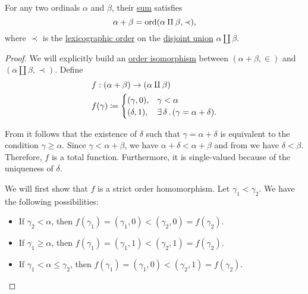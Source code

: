 \begin{proposition}\label{thm:ordinal_addition_disjoin_union}
  For any two ordinals \( \alpha \) and \( \beta \), their \hyperref[def:ordinal_arithmetic/addition]{sum} satisfies
  \begin{equation*}
    \alpha + \beta = \operatorname{ord}(\alpha \amalg \beta, \prec),
  \end{equation*}
  where \( \prec \) is the \hyperref[def:lexicographic_order]{lexicographic order} on the \hyperref[def:disjoint_union]{disjoint union} \( \alpha \amalg \beta \).
\end{proposition}
\begin{proof}
  We will explicitly build an \hyperref[def:order_homomorphism/isomorphism]{order isomorphism} between \( (\alpha + \beta, \in) \) and \( (\alpha \amalg \beta, \prec) \). Define
  \begin{equation*}
    \begin{aligned}
      &f: (\alpha + \beta) \to (\alpha \amalg \beta) \\
      &f(\gamma) \coloneqq \begin{cases}
        (\gamma, 0), &\gamma < \alpha \\
        (\delta, 1), &\exists \thinspace \delta \thinspace . \thinspace (\gamma = \alpha + \delta).
      \end{cases}
    \end{aligned}
  \end{equation*}

  From  it follows that the existence of \( \delta \) such that \( \gamma = \alpha + \delta \) is equivalent to the condition \( \gamma \geq \alpha \). Since \( \gamma < \alpha + \beta \), we have \( \alpha + \delta < \alpha + \beta \) and from  we have \( \delta < \beta \). Therefore, \( f \) is a total function. Furthermore, it is single-valued because of the uniqueness of \( \delta \).

  We will first show that \( f \) is a strict order homomorphism. Let \( \gamma_1 < \gamma_2 \). We have the following possibilities:
  \begin{itemize}
    \item If \( \gamma_2 < \alpha \), then \( f(\gamma_1) = (\gamma_1, 0) < (\gamma_2, 0) = f(\gamma_2) \).
    \item If \( \gamma_1 \geq \alpha \), then \( f(\gamma_1) = (\gamma_1, 1) < (\gamma_2, 1) = f(\gamma_2) \).
    \item If \( \gamma_1 < \alpha \leq \gamma_2 \), then \( f(\gamma_1) = (\gamma_1, 0) < (\gamma_2, 1) = f(\gamma_2) \).
  \end{itemize}


\end{proof}
